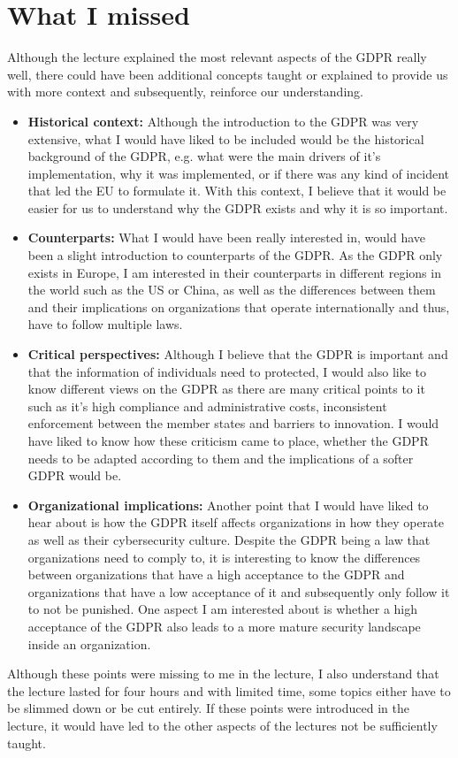 \documentclass[12pt]{article}
\begin{document}
\section{What I missed}
Although the lecture explained the most relevant aspects of the GDPR really well, there could have been additional concepts taught or explained to provide us with more context and subsequently, reinforce our understanding. 
\begin{itemize}
\item \textbf{Historical context:} Although the introduction to the GDPR was very extensive, what I would have liked to be included would be the historical background of the GDPR, e.g. what were the main drivers of it's implementation, why it was implemented, or if there was any kind of incident that led the EU to formulate it. With this context, I believe that it would be easier for us to understand why the GDPR exists and why it is so important.
\item \textbf{Counterparts:} What I would have been really interested in, would have been a slight introduction to counterparts of the GDPR. As the GDPR only exists in Europe, I am interested in their counterparts in different regions in the world such as the US or China, as well as the differences between them and their implications on organizations that operate internationally and thus, have to follow multiple laws.
\item \textbf{Critical perspectives:} Although I believe that the GDPR is important and that the information of individuals need to protected, I would also like to know different views on the GDPR as there are many critical points to it such as it's high compliance and administrative costs, inconsistent enforcement between the member states and barriers to innovation. I would have liked to know how these criticism came to place, whether the GDPR needs to be adapted according to them and the implications of a softer GDPR would be.
\item \textbf{Organizational implications:} Another point that I would have liked to hear about is how the GDPR itself affects organizations in how they operate as well as their cybersecurity culture. Despite the GDPR being a law that organizations need to comply to, it is interesting to know the differences between organizations that have a high acceptance to the GDPR and organizations that have a low acceptance of it and subsequently only follow it to not be punished. One aspect I am interested about is whether a high acceptance of the GDPR also leads to a more mature security landscape inside an organization.
\end{itemize}
Although these points were missing to me in the lecture, I also understand that the lecture lasted for four hours and with limited time, some topics either have to be slimmed down or be cut entirely. If these points were introduced in the lecture, it would have led to the other aspects of the lectures not be sufficiently taught.
\end{document}

